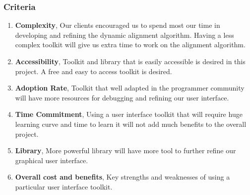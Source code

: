 \subsubsection{Criteria}
\begin{enumerate}
	\item \textbf{Complexity}, Our clients encouraged us to spend most our time in developing and refining the dynamic alignment algorithm. Having a less complex toolkit will give us extra time to work on the alignment algorithm. 
	\item \textbf{Accessibility}, Toolkit and library that is easily accessible is desired in this project. A free and easy to access toolkit is desired. 
	\item \textbf{Adoption Rate}, Toolkit that well adapted in the programmer community will have more resources for debugging and refining our user interface. 
	\item \textbf{Time Commitment}, Using a user interface toolkit that will require huge learning curve and time to learn it will not add much benefits to the overall project. 
	\item \textbf{Library}, More powerful library will have more tool to further refine our graphical user interface. 
	\item \textbf{Overall cost and benefits}, Key strengths and weaknesses of using a particular user interface toolkit.\\
\end{enumerate}

\newpage
